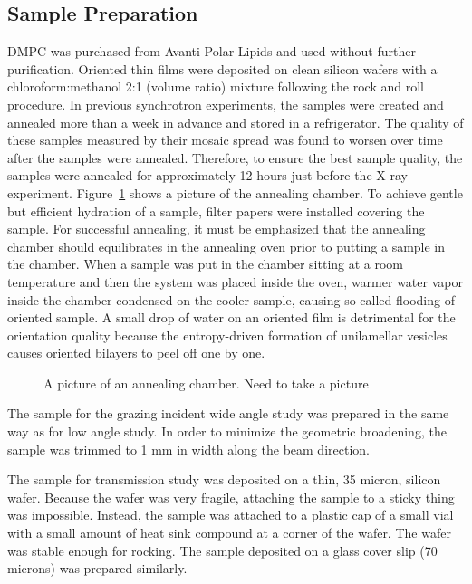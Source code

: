 \subsection{Sample Preparation}
DMPC was purchased from Avanti Polar Lipids and used without further purification.
Oriented thin films were deposited on clean silicon wafers with
a chloroform:methanol 2:1 (volume ratio) mixture following the rock and roll procedure.   
In previous synchrotron experiments, the samples were created and annealed 
more than a week in advance and stored in a refrigerator. The quality of 
these samples measured by their mosaic spread was found to worsen over time
after the samples were annealed. Therefore, to ensure the best sample quality, the 
samples were annealed for approximately 12 hours just before the X-ray experiment.
Figure~\ref{fig:annealing_chamber} shows a picture of the annealing chamber. 
To achieve gentle but efficient hydration of a sample, filter papers were installed 
covering the sample. For successful annealing, it must be emphasized that the annealing 
chamber should equilibrates in the annealing oven prior to putting a sample in the chamber.
When a sample was put in the chamber sitting at a room temperature and
then the system was placed inside the oven, warmer water vapor inside the chamber 
condensed on the cooler sample, causing so called flooding of oriented sample. 
A small drop of water on an oriented film is detrimental for the orientation quality because the
entropy-driven formation of unilamellar vesicles causes oriented bilayers to peel off
one by one. 

\begin{figure}
  \centering
  \caption{A picture of an annealing chamber. Need to take a picture}
  \label{fig:annealing_chamber}
\end{figure}

The sample for the grazing incident wide angle study was prepared in the same way 
as for low angle study. In order to minimize the geometric broadening, the 
sample was trimmed to 1 mm in width along the beam direction.

The sample for transmission study was deposited on a thin, 35 micron, silicon
wafer. Because the wafer was very fragile, attaching the sample to a sticky 
thing was impossible. Instead, the sample was attached to a plastic cap of 
a small vial with a small amount of heat sink compound at a corner of the 
wafer. The wafer was stable enough for rocking. The sample deposited on a 
glass cover slip (70 microns) was prepared similarly.  

